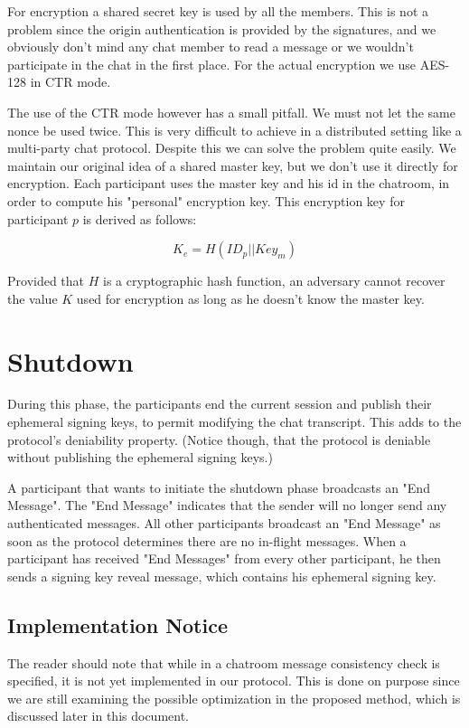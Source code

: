 \documentclass[12pt,titlepage,a4paper]{article}
\begin{document}
{For encryption a shared secret key is used by all the members. This is not a
problem since the origin authentication is provided by the signatures, and
we obviously don't mind any chat member to read a message or we wouldn't
participate in the chat in the first place. For the actual encryption we
use AES-128 in CTR mode.

The use of the CTR mode however has a small pitfall. We must not let the same
nonce be used twice. This is very difficult to achieve in a distributed setting
like a multi-party chat protocol. Despite this we can solve the problem quite
easily. We maintain our original idea of a shared master key, but we don't use
it directly for encryption. Each participant uses the master key and his id in
the chatroom, in order to compute his "personal" encryption key. This encryption
key for participant $p$ is derived as follows:

\[
    K_e = H(ID_p || Key_m)
\]

Provided that $H$ is a cryptographic hash function, an adversary cannot recover
the value $K$ used for encryption as long as he doesn't know the master key.
}
\section{Shutdown}

During this phase, the participants end the current session and publish their
ephemeral signing keys, to permit modifying the chat transcript. This adds to
the protocol's deniability property. (Notice though, that the protocol is
deniable without publishing the ephemeral signing keys.)

A participant that wants to initiate the shutdown phase broadcasts an
"End Message". The "End Message" indicates that the sender will no longer send
any authenticated messages. All other participants broadcast an "End Message"
as soon as the protocol determines there are no in-flight messages. When a
participant has received "End Messages" from every other participant, he then
sends a signing key reveal message, which contains his ephemeral signing key.

\subsection{Implementation Notice}

The reader should note that while in \cite{mpotr} a chatroom message consistency
check is specified, it is not yet implemented in our protocol. This is done on
purpose since we are still examining the possible optimization in the proposed
method, which is discussed later in this document.
\end{document}
